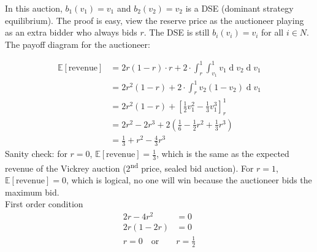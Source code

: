\documentclass{article}
\renewcommand{\d}[1]{\ensuremath{\operatorname{d}\!{#1}}}
\begin{document}
\noindent
In this auction, $b_1(v_1)=v_1$ and $b_2(v_2)=v_2$ is a DSE (dominant strategy equilibrium). The proof is easy, view the reserve price as the auctioneer playing as an extra bidder who always bids $r$. The DSE is still $b_i(v_i)=v_i$ for all $i\in N$. The payoff diagram for the auctioneer:

\begin{center}
\end{center}

\begin{equation*}
    \begin{aligned}
        \mathbb{E}[\text{revenue}]&=2r(1-r)\cdot r+2\cdot\int_r^1\int_{v_1}^1v_1\d v_2 \d v_1\\
        &=2r^2(1-r)+2\cdot\int_r^1v_2(1-v_2)\d v_1\\
        &=2r^2(1-r)+\left[\frac{1}{2}v_1^2-\frac{1}{3}v_1^3\right]_r^1\\
        &=2r^2-2r^3+2\left(\frac{1}{6}-\frac{1}{2}r^2+\frac{1}{3}r^3\right)\\
        &=\frac{1}{3}+r^2-\frac{4}{3}r^3
    \end{aligned}
\end{equation*}
Sanity check: for $r=0$, $\mathbb{E}[\text{revenue}]=\frac{1}{3}$, which is the same as the expected revenue of the Vickrey auction (2\textsuperscript{nd} price, sealed bid auction). For $r=1$, $\mathbb{E}[\text{revenue}]=0$, which is logical, no one will win because the auctioneer bids the maximum bid.\\

\noindent
First order condition
\begin{equation*}
    \begin{aligned}
        2r-4r^2&=0\\
        2r(1-2r)&=0\\
        r=0\quad\text{or}\quad &r=\frac{1}{2}
    \end{aligned}
\end{equation*}
\end{document}
